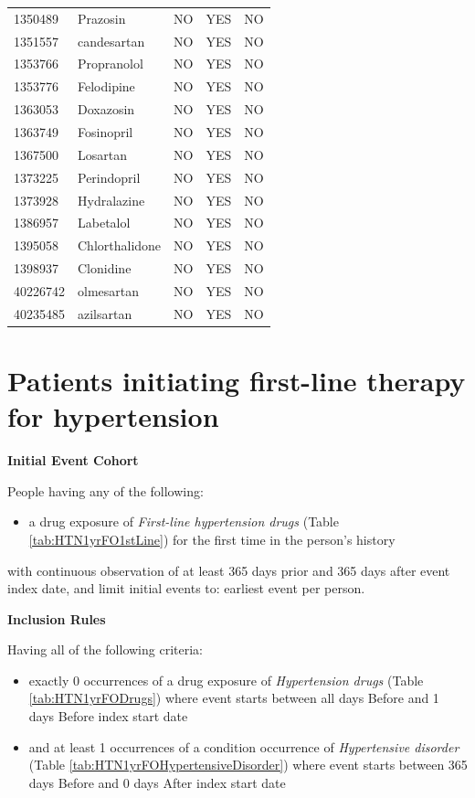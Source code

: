 \documentclass[11pt]{book}
\providecommand{\tightlist}{%
  \setlength{\itemsep}{0pt}\setlength{\parskip}{0pt}}
\theoremstyle{definition}
\theoremstyle{definition}
\theoremstyle{definition}
\theoremstyle{remark}
\begin{document}
\begin{longtable}[]{@{}lllll@{}}
1350489 & Prazosin & NO & YES & NO\tabularnewline
1351557 & candesartan & NO & YES & NO\tabularnewline
1353766 & Propranolol & NO & YES & NO\tabularnewline
1353776 & Felodipine & NO & YES & NO\tabularnewline
1363053 & Doxazosin & NO & YES & NO\tabularnewline
1363749 & Fosinopril & NO & YES & NO\tabularnewline
1367500 & Losartan & NO & YES & NO\tabularnewline
1373225 & Perindopril & NO & YES & NO\tabularnewline
1373928 & Hydralazine & NO & YES & NO\tabularnewline
1386957 & Labetalol & NO & YES & NO\tabularnewline
1395058 & Chlorthalidone & NO & YES & NO\tabularnewline
1398937 & Clonidine & NO & YES & NO\tabularnewline
40226742 & olmesartan & NO & YES & NO\tabularnewline
40235485 & azilsartan & NO & YES & NO\tabularnewline
\bottomrule
\end{longtable}

\hypertarget{HTN1yrFO}{%
\section{Patients initiating first-line therapy for hypertension}\label{HTN1yrFO}}

\textbf{Initial Event Cohort}

People having any of the following:

\begin{itemize}
\tightlist
\item
  a drug exposure of \emph{First-line hypertension drugs} (Table \ref{tab:HTN1yrFO1stLine}) for the first time in the person's history
\end{itemize}

with continuous observation of at least 365 days prior and 365 days after event index date, and limit initial events to: earliest event per person.

\textbf{Inclusion Rules}

Having all of the following criteria:

\begin{itemize}
\tightlist
\item
  exactly 0 occurrences of a drug exposure of \emph{Hypertension drugs} (Table \ref{tab:HTN1yrFODrugs}) where event starts between all days Before and 1 days Before index start date
\item
  and at least 1 occurrences of a condition occurrence of \emph{Hypertensive disorder} (Table \ref{tab:HTN1yrFOHypertensiveDisorder}) where event starts between 365 days Before and 0 days After index start date
\end{itemize}
\end{document}
